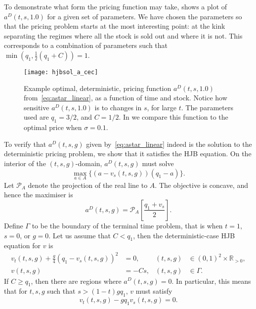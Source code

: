 \documentclass[main.tex]{subfiles}
\begin{document}
\begin{example}\label{ex:acecplot}
  To demonstrate what form the pricing function may take,
   shows a plot of $a^D(t,s,1.0)$ for a given set of
  parameters. We have chosen the parameters so that the pricing
  problem starts at the most interesting point: at the kink separating
  the regimes where all the stock is sold out and where it is not.
  This corresponds to a combination of parameters such that
  $\min(q_1,\frac{1}{2}(q_1+C))=1$.

  \begin{figure}[htbp]
    \centering
    \texttt{[image: hjbsol\_a\_cec]}
    \caption*{$a^D(t,s,1.0)$}
    \caption{Example optimal, deterministic, pricing function $a^D(t,s,1.0)$
      from~\eqref{eq:astar_linear}, as a function of time and stock.
      Notice how sensitive $a^D(t,s,1.0)$ is to changes in $s$, for large
      $t$.
      The parameters used are $q_1=3/2$, and $C=1/2$.
      In  we compare this function to the optimal price
      when $\sigma=0.1$.
    }\label{fig:hjbsol_a_cec}
  \end{figure}
\end{example}

To verify that $a^D(t,s,g)$ given by~\eqref{eq:astar_linear} indeed is
the solution to the deterministic
pricing problem, we show that it satisfies the HJB equation.
On the interior of the $(t,s,g)$-domain, $a^D(t,s,g)$ must solve
\begin{equation}
  \max_{a\in A} \{(a-v_s(t,s,g))(q_1-a)\}.
\end{equation}
Let $\mathcal P_A$ denote the projection of the real line to $A$. The
objective is concave, and hence the maximiser is
\begin{equation}\label{eq:astar_hjb_linear}
  a^D(t,s,g) = \mathcal P_A\left[\frac{q_1+v_s}{2}\right].
\end{equation}
Define $\Gamma$ to be the boundary of the terminal time problem,
that is when $t=1$, $s=0$, or $g=0$.
Let us assume that $C< q_1$, then the
deterministic-case HJB equation for $v$ is
\begin{align}\label{eq:hjb_linear}
  v_t(t,s,g)+
  \frac{g}{4}{( q_1-v_s(t,s,g))}^2
  &=0,&(t,s,g)&\in{(0,1)}^2\times \mathbb R_{>0},\\
  v(t,s,g) &= -Cs,&(t,s,g)&\in \Gamma.
\end{align}
If $C\geq q_1$, then there are regions where $a^D(t,s,g)=0$. In
particular, this means that for $t,s,g$ such that
$s>(1-t)gq_1$, $v$ must satisfy
\begin{equation}\label{eq:hjb_linear_Clarge}
  v_t(t,s,g) - gq_1v_s(t,s,g)=0.
\end{equation}
\end{document}
